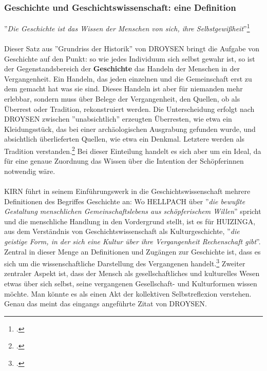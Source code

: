 \documentclass[12pt,a4paper]{article}
\begin{document}
\subsubsection{Geschichte und Geschichtswissenschaft: eine Definition}

''\textit{Die Geschichte ist das Wissen der Menschen von sich, ihre Selbstgewißheit}''\footcite[][S.111]{hardtwig1990studium}
\\
\\
Dieser Satz aus ''Grundriss der Historik'' von DROYSEN bringt die Aufgabe von Geschichte auf den Punkt: so wie jedes Individuum sich selbst gewahr ist, so ist der Gegenstandsbereich der \textbf{Geschichte} das Handeln der Menschen in der Vergangenheit. Ein Handeln, das jeden einzelnen und die Gemeinschaft erst zu dem gemacht hat was sie sind.
Dieses Handeln ist aber für niemanden mehr erlebbar, sondern muss über Belege der Vergangenheit, den Quellen, ob als Überrest oder Tradition, rekonstruiert werden. Die Unterscheidung erfolgt nach DROYSEN zwischen ''unabsichtlich'' erzeugten Überresten, wie etwa ein Kleidungsstück, das bei einer archäologischen Ausgrabung gefunden wurde, und absichtlich überlieferten Quellen, wie etwa ein Denkmal. Letztere werden als Tradition verstanden.\footcite[][49–55]{schulz2010neuere} Bei dieser Einteilung handelt es sich aber um ein Ideal, da für eine genaue Zuordnung das Wissen über die Intention der Schöpferinnen notwendig wäre. 
\\
\\
KIRN führt in seinem Einführungswerk in die Geschichtswissenschaft mehrere Definitionen des Begriffes Geschichte an: Wo HELLPACH über ''\textit{die bewußte Gestaltung menschlichen Gemeinschaftslebens aus schöpferischem Willen}'' spricht und die menschliche Handlung in den Vordergrund stellt, ist es für HUIZINGA, aus dem Verständnis von Geschichtswissenschaft als Kulturgeschichte, ''\textit{die geistige Form, in der sich eine Kultur über ihre Vergangenheit Rechenschaft gibt}''. Zentral in dieser Menge an Definitionen und Zugängen zur Geschichte ist, dass es sich um die wissenschaftliche Darstellung des Vergangenen handelt.\footcite[][S.7-12]{KirnPaul2015EidG} Zweiter zentraler Aspekt ist, dass der Mensch als gesellschaftliches und kulturelles Wesen etwas über sich selbst, seine vergangenen Gesellschaft- und Kulturformen wissen möchte. Man könnte es als einen Akt der kollektiven Selbstreflexion verstehen. Genau das meint das eingangs angeführte Zitat von DROYSEN.
\\
\end{document}
